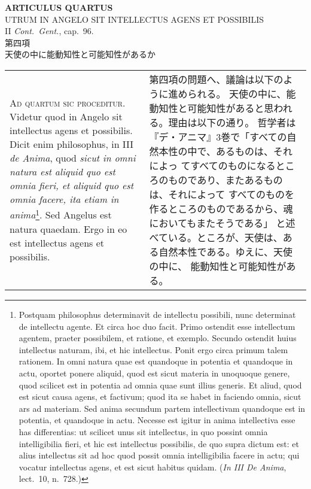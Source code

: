 \documentclass[10pt]{jsarticle} %
\begin{document}
\begin{center}
 {\Large {\bf ARTICULUS QUARTUS}}\\
 {\large UTRUM IN ANGELO SIT INTELLECTUS AGENS ET POSSIBILIS}\\
 {\footnotesize II {\itshape Cont.~Gent.}, cap.~96.}\\
 {\Large 第四項\\天使の中に能動知性と可能知性があるか}
\end{center}

\begin{longtable}{p{21em}p{21em}}

{\huge A}{\scshape d quartum sic proceditur}. Videtur quod in Angelo sit
intellectus agens et possibilis. Dicit enim philosophus, in III
{\itshape de Anima}, quod {\itshape sicut in omni natura est aliquid quo
est omnia fieri, et aliquid quo est omnia facere, ita etiam in
anima}\footnote{Postquam philosophus determinavit de intellectu
 possibili, nunc determinat de intellectu agente. Et circa hoc duo
 facit. Primo ostendit esse intellectum agentem, praeter possibilem, et
 ratione, et exemplo. Secundo ostendit huius intellectus naturam, ibi,
 et hic intellectus. Ponit ergo circa primum talem rationem. In omni
 natura quae est quandoque in potentia et quandoque in actu, oportet
 ponere aliquid, quod est sicut materia in unoquoque genere, quod
 scilicet est in potentia ad omnia quae sunt illius generis. Et aliud,
 quod est sicut causa agens, et factivum; quod ita se habet in faciendo
 omnia, sicut ars ad materiam. Sed anima secundum partem intellectivam
 quandoque est in potentia, et quandoque in actu. Necesse est igitur in
 anima intellectiva esse has differentias: ut scilicet unus sit
 intellectus, in quo possint omnia intelligibilia fieri, et hic est
 intellectus possibilis, de quo supra dictum est: et alius intellectus
 sit ad hoc quod possit omnia intelligibilia facere in actu; qui vocatur
 intellectus agens, et est sicut habitus quidam. ({\itshape In III De
 Anima}, lect.~10, n.~728.)}. Sed Angelus est natura quaedam. Ergo in eo est intellectus agens
et possibilis.

&

第四項の問題へ、議論は以下のように進められる。
天使の中に、能動知性と可能知性があると思われる。理由は以下の通り。
哲学者は『デ・アニマ』3巻で「すべての自然本性の中で、あるものは、それによっ
 てすべてのものになるところのものであり、またあるものは、それによって
 すべてのものを作るところのものであるから、魂においてもまたそうである」
 と述べている。ところが、天使は、ある自然本性である。ゆえに、天使の中に、
 能動知性と可能知性がある。


\end{longtable}
\end{document}
